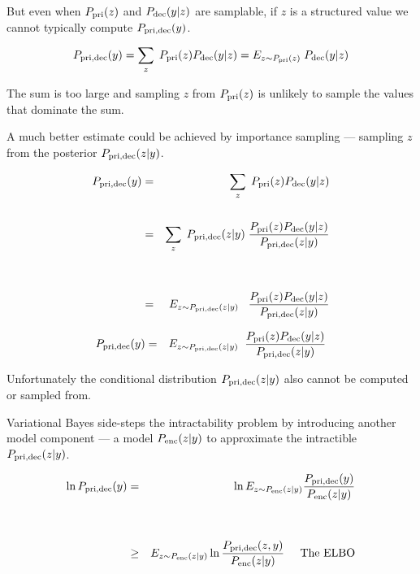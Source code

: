 {

But even when $P_{\mathrm{pri}}(z)$ and $P_{\mathrm{dec}}(y|z)$ are samplable, if $z$ is a structured value we cannot typically compute $P_{\mathrm{pri},\mathrm{dec}}(y)$.

\vfill
$$P_{\mathrm{pri},\mathrm{dec}}(y) = \sum_z\;P_{\mathrm{pri}}(z)P_{\mathrm{dec}}(y|z) = E_{z\sim P_{\mathrm{pri}}(z)}\;P_{\mathrm{dec}}(y|z)$$

\vfill
The sum is too large and sampling $z$ from $P_{\mathrm{pri}}(z)$ is unlikely to sample the values that dominate the sum.


\vfill
A much better estimate could be achieved by importance sampling --- sampling $z$ from the posterior $P_{\mathrm{pri},\mathrm{dec}}(z|y)$.

{\huge
\begin{eqnarray*}
P_{\mathrm{pri},\mathrm{dec}}(y) & = & \sum_z\;P_{\mathrm{pri}}(z) P_{\mathrm{dec}}(y|z) \\
\\
 & = & \sum_z\;P_{\mathrm{pri},\mathrm{dec}}(z|y)\;\frac{P_{\mathrm{pri}}(z)P_{\mathrm{dec}}(y|z)}{P_{\mathrm{pri},\mathrm{dec}}(z|y)} \\
 \\
 \\
  & = & E_{z\sim P_{\mathrm{pri},\mathrm{dec}}(z|y)}\;\;\;\frac{P_{\mathrm{pri}}(z)P_{\mathrm{dec}}(y|z)}{P_{\mathrm{pri},\mathrm{dec}}(z|y)}
\end{eqnarray*}
}


\begin{eqnarray*}
P_{\mathrm{pri},\mathrm{dec}}(y) & = & E_{z\sim P_{\mathrm{pri},\mathrm{dec}}(z|y)}\;\;\frac{P_{\mathrm{pri}}(z)P_{\mathrm{dec}}(y|z)}{P_{\mathrm{pri},\mathrm{dec}}(z|y)}
\end{eqnarray*}

\vfill
Unfortunately the conditional distribution $P_{\mathrm{pri},\mathrm{dec}}(z|y)$ also cannot be computed or sampled from.

\vfill
Variational Bayes side-steps the intractability problem by introducing another model component --- a model $P_{\mathrm{enc}}(z|y)$ to approximate the intractible $P_{\mathrm{pri},\mathrm{dec}}(z|y)$.


{\huge
\begin{eqnarray*}
 {\ln P_{\mathrm{pri},\mathrm{dec}}(y)} & = & \ln E_{z \sim { P_{\mathrm{enc}}(z|y)}} \frac{P_{\mathrm{pri},\mathrm{dec}}(y)}{P_{\mathrm{enc}}(z|y)} \\
\\
\\
  &  \geq & E_{z \sim { P_{\mathrm{enc}}(z|y)}} \ln \frac{P_{\mathrm{pri},\mathrm{dec}}(z,y)}{{ P_{\mathrm{enc}}(z|y)}} \;\;\;\;\;\mbox{The ELBO}
\end{eqnarray*}
}


}

